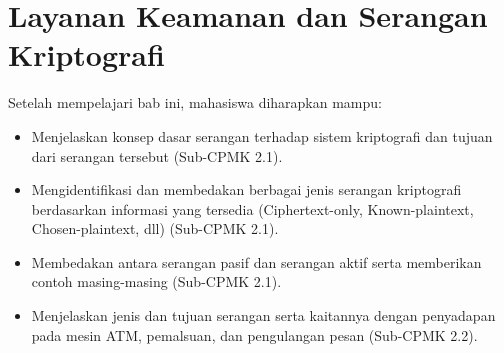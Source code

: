 \documentclass[../../main.tex]{subfiles}
\begin{document}
\chapter{Layanan Keamanan dan Serangan Kriptografi}
\label{chap:layanan-keamanan}

\begin{learningoutcome}
Setelah mempelajari bab ini, mahasiswa diharapkan mampu:
\begin{itemize}
    \item Menjelaskan konsep dasar serangan terhadap sistem kriptografi dan tujuan dari serangan tersebut (Sub-CPMK 2.1).
    \item Mengidentifikasi dan membedakan berbagai jenis serangan kriptografi berdasarkan informasi yang tersedia (Ciphertext-only, Known-plaintext, Chosen-plaintext, dll) (Sub-CPMK 2.1).
    \item Membedakan antara serangan pasif dan serangan aktif serta memberikan contoh masing-masing (Sub-CPMK 2.1).
    \item Menjelaskan jenis dan tujuan serangan serta kaitannya dengan penyadapan pada mesin ATM, pemalsuan, dan pengulangan pesan (Sub-CPMK 2.2).
\end{itemize}
\end{learningoutcome}











\end{document}
